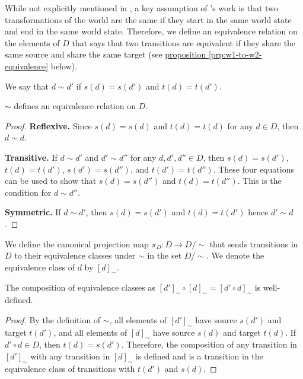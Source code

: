 While not explicitly mentioned in \cite{Higgins2018}, a key assumption of \cite{Higgins2018}'s work is that two transformations of the world are the same if they start in the same world state and end in the same world state.
Therefore, we define an equivalence relation on the elements of $D$ that says that two transitions are equivalent if they share the same source and share the same target (see \hyperref[prp:w1-to-w2-equivalence]{proposition \ref*{prp:w1-to-w2-equivalence}} below).



\begin{definition}
    We say that $d \sim d'$ if $s(d) = s(d')$ and $t(d) = t(d')$.
\end{definition}

\begin{proposition}\label{prp:w1-to-w2-equivalence}
    $\sim$ defines an equivalence relation on $D$.
\end{proposition}\begin{proof} 
    \textbf{Reflexive.}
    Since $s(d)=s(d)$ and $t(d)=t(d)$ for any $d \in D$, then $d \sim d$.
    
    \textbf{Transitive.}
    If $d \sim d'$ and $d' \sim d''$ for any $d, d', d'' \in D$, then $s(d) = s(d')$, $t(d) = t(d')$, $s(d')=s(d'')$, and $t(d')=t(d'')$.
    These four equations can be used to show that $s(d) = s(d'')$ and $t(d) = t(d'')$.
    This is the condition for $d \sim d''$.
    
    \textbf{Symmetric.}
    If $d \sim d'$, then $s(d)=s(d')$ and $t(d)=t(d')$ hence $d' \sim d$.
\end{proof}

We define the canonical projection map $\pi_{D}: D \to D/\sim$ that sends transitions in $D$ to their equivalence classes under $\sim$ in the set $D/\sim$.
We denote the equivalence class of $d$ by $[d]_{\sim}$.

\begin{proposition}\label{prp:equivalence-class-composition}
    The composition of equivalence classes as $[d']_{\sim} \circ [d]_{\sim} = [d' \circ d ]_{\sim}$ is well-defined.
\end{proposition}\begin{proof}
     By the definition of $\sim$, all elements of $[d']_{\sim}$ have source $s(d')$ and target $t(d')$, and all elements of $[d]_{\sim}$ have source $s(d)$ and target $t(d)$.
     If $d' \circ d \in D$, then $t(d)=s(d')$.
     Therefore, the composition of any transition in $[d']_{\sim}$ with any transition in $[d]_{\sim}$ is defined and is a transition in the equivalence class of transitions with $t(d')$ and $s(d)$.
\end{proof}

